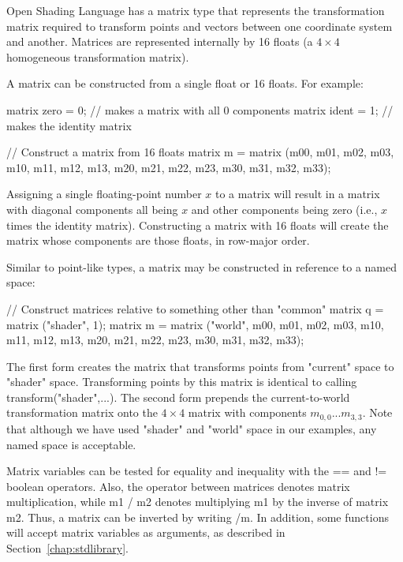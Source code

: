 \documentclass[11pt,letterpaper]{book}
\def\langname{Open Shading Language\xspace}
\def\matrix{{\cf matrix}\xspace}
\def\currentspace{{\cf "current"} space\xspace}
\def\shaderspace{{\cf "shader"} space\xspace}
\begin{document}
\langname has a \matrix type that represents the transformation matrix
required to transform points and vectors between one coordinate system
and another.  Matrices are represented internally by 16 floats (a $4
\times 4$ homogeneous transformation matrix).

A \matrix can be constructed from a single float or 16 floats.  For
example:

\begin{code}
    matrix zero = 0;   // makes a matrix with all 0 components
    matrix ident = 1;  // makes the identity matrix

    // Construct a matrix from 16 floats
    matrix m = matrix (m00, m01, m02, m03, m10, m11, m12, m13, 
                       m20, m21, m22, m23, m30, m31, m32, m33);
\end{code}

\noindent Assigning a single floating-point number $x$ to a matrix will result
in a matrix with diagonal components all being $x$ and other
components being zero (i.e., $x$ times the identity matrix).
Constructing a matrix with 16 floats will create the matrix whose
components are those floats, in row-major order.  

Similar to point-like types, a {\cf matrix} may be constructed in
reference to a named space:

\begin{code}
    // Construct matrices relative to something other than "common"
    matrix q = matrix ("shader", 1);
    matrix m = matrix ("world", m00, m01, m02, m03, m10, m11, m12, m13, 
                               m20, m21, m22, m23, m30, m31, m32, m33);
\end{code}

\noindent The first form creates the matrix that transforms points from
\currentspace to \shaderspace.  Transforming points by this matrix
is identical to calling {\cf transform("shader",...)}.
The second form prepends the current-to-world transformation matrix
onto the $4 \times 4$ matrix with components $m_{0,0} ... m_{3,3}$.
Note that although we have used {\cf "shader"} and {\cf "world"}
space in our examples, any named space is acceptable.

Matrix variables can be tested for equality and inequality with the
{\cf ==} and {\cf !=} boolean operators.  Also, the {\cf *} operator
between matrices denotes matrix multiplication, while {\cf m1 / m2}
denotes multiplying {\cf m1} by the inverse of matrix {\cf m2}.  Thus,
a matrix can be inverted by writing {/m}.  In addition, some
functions will accept matrix variables as arguments, as described in
Section~\ref{chap:stdlibrary}.
\end{document}
